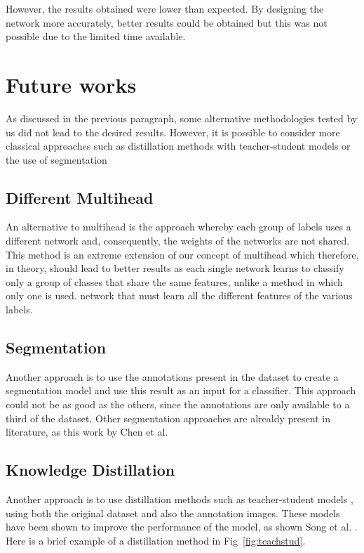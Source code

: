 \documentclass[journal, a4paper]{IEEEtran}
\begin{document}
However, the results obtained were lower than expected. By designing the network more accurately, better results could be obtained but this was not possible due to the limited time available.
\section{Future works}
As discussed in the previous paragraph, some alternative methodologies tested by us did not lead to the desired results. However, it is possible to consider more classical approaches such as distillation methods with teacher-student models or the use of segmentation

\subsection{Different Multihead}
An alternative to multihead is the approach whereby each group of labels uses a different network and, consequently, the weights of the networks are not shared. This method is an extreme extension of our concept of multihead which therefore, in theory, should lead to better results as each single network learns to classify only a group of classes that share the same features, unlike a method in which only one is used. network that must learn all the different features of the various labels.

\subsection{Segmentation}
Another approach is to use the annotations present in the dataset to create a segmentation model and use this result as an input for a classifier. This approach could not be as good as the others, since the annotations are only available to a third of the dataset. Other segmentation approaches are alrealdy present in literature, as this work by Chen et al\cite{SEGMENTATION}.

\subsection{Knowledge Distillation}
Another approach is to use distillation methods such as teacher-student models \cite{DISTILLATION}, using both the original dataset and also the annotation images. These models have been shown to improve the performance of the model, as shown Song et al. \cite{DISTILLATION2}. Here is a brief example of a distillation method in Fig~\ref{fig:teachstud}.
\end{document}
